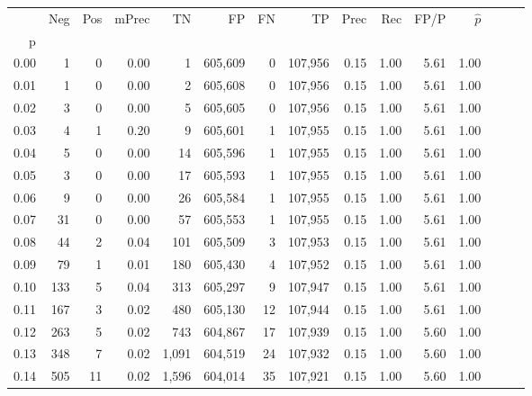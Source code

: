 \begin{tabular}{rrrrrrrrrrrrrrr}
\toprule
{} &     Neg &    Pos & mPrec &       TN &       FP &       FN &       TP &  Prec &   Rec &  FP/P & $\hat{p}$ \\
p    &         &        &       &          &          &          &          &       &       &       &           \\
\midrule
0.00 &       1 &      0 &  0.00 &        1 &  605,609 &        0 &  107,956 &  0.15 &  1.00 &  5.61 &      1.00 \\
0.01 &       1 &      0 &  0.00 &        2 &  605,608 &        0 &  107,956 &  0.15 &  1.00 &  5.61 &      1.00 \\
0.02 &       3 &      0 &  0.00 &        5 &  605,605 &        0 &  107,956 &  0.15 &  1.00 &  5.61 &      1.00 \\
0.03 &       4 &      1 &  0.20 &        9 &  605,601 &        1 &  107,955 &  0.15 &  1.00 &  5.61 &      1.00 \\
0.04 &       5 &      0 &  0.00 &       14 &  605,596 &        1 &  107,955 &  0.15 &  1.00 &  5.61 &      1.00 \\
0.05 &       3 &      0 &  0.00 &       17 &  605,593 &        1 &  107,955 &  0.15 &  1.00 &  5.61 &      1.00 \\
0.06 &       9 &      0 &  0.00 &       26 &  605,584 &        1 &  107,955 &  0.15 &  1.00 &  5.61 &      1.00 \\
0.07 &      31 &      0 &  0.00 &       57 &  605,553 &        1 &  107,955 &  0.15 &  1.00 &  5.61 &      1.00 \\
0.08 &      44 &      2 &  0.04 &      101 &  605,509 &        3 &  107,953 &  0.15 &  1.00 &  5.61 &      1.00 \\
0.09 &      79 &      1 &  0.01 &      180 &  605,430 &        4 &  107,952 &  0.15 &  1.00 &  5.61 &      1.00 \\
0.10 &     133 &      5 &  0.04 &      313 &  605,297 &        9 &  107,947 &  0.15 &  1.00 &  5.61 &      1.00 \\
0.11 &     167 &      3 &  0.02 &      480 &  605,130 &       12 &  107,944 &  0.15 &  1.00 &  5.61 &      1.00 \\
0.12 &     263 &      5 &  0.02 &      743 &  604,867 &       17 &  107,939 &  0.15 &  1.00 &  5.60 &      1.00 \\
0.13 &     348 &      7 &  0.02 &    1,091 &  604,519 &       24 &  107,932 &  0.15 &  1.00 &  5.60 &      1.00 \\
0.14 &     505 &     11 &  0.02 &    1,596 &  604,014 &       35 &  107,921 &  0.15 &  1.00 &  5.60 &      1.00 \\

\end{tabular}
